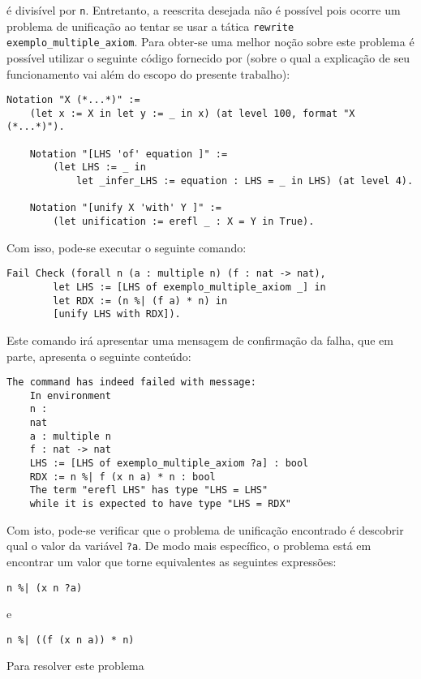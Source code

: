 é divisível por \lstinline[language = coq]!n!. Entretanto, a reescrita desejada não é possível pois ocorre um problema de unificação ao tentar se usar a tática \lstinline[language = coq]!rewrite exemplo_multiple_axiom!. Para obter-se uma melhor noção sobre este problema é possível utilizar o seguinte código fornecido por \cite{assia_mahboubi_2022_7118596} (sobre o qual a explicação de seu funcionamento vai além do escopo do presente trabalho):
\begin{lstlisting}[language = coq]
    Notation "X (*...*)" :=
    (let x := X in let y := _ in x) (at level 100, format "X  (*...*)").

    Notation "[LHS 'of' equation ]" := 
        (let LHS := _ in 
            let _infer_LHS := equation : LHS = _ in LHS) (at level 4).

    Notation "[unify X 'with' Y ]" := 
        (let unification := erefl _ : X = Y in True).
\end{lstlisting} 
Com isso, pode-se executar o seguinte comando:
\begin{lstlisting}[language = coq]
    Fail Check (forall n (a : multiple n) (f : nat -> nat),
        let LHS := [LHS of exemplo_multiple_axiom _] in
        let RDX := (n %| (f a) * n) in
        [unify LHS with RDX]).
\end{lstlisting}
Este comando irá apresentar uma mensagem de confirmação da falha, que em parte, apresenta o seguinte conteúdo:
\begin{lstlisting}[language = coq-error]
    The command has indeed failed with message:
    In environment
    n :
    nat
    a : multiple n
    f : nat -> nat
    LHS := [LHS of exemplo_multiple_axiom ?a] : bool
    RDX := n %| f (x n a) * n : bool
    The term "erefl LHS" has type "LHS = LHS"
    while it is expected to have type "LHS = RDX"
\end{lstlisting} 
Com isto, pode-se verificar que o problema de unificação encontrado é descobrir qual o valor da variável \lstinline[language = coq]!?a!. De modo mais específico, o problema está em encontrar um valor que torne equivalentes as seguintes expressões:
\begin{lstlisting}[language = coq]
    n %| (x n ?a)
\end{lstlisting} 
e
\begin{lstlisting}[language = coq]
    n %| ((f (x n a)) * n)
\end{lstlisting}
 Para resolver este problema %
